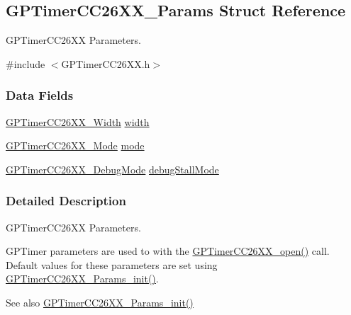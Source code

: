 \subsection{G\+P\+Timer\+C\+C26\+X\+X\+\_\+\+Params Struct Reference}
\label{struct_g_p_timer_c_c26_x_x___params}


G\+P\+Timer\+C\+C26\+X\+X Parameters.  




{\ttfamily \#include $<$G\+P\+Timer\+C\+C26\+X\+X.\+h$>$}

\subsubsection*{Data Fields}
\begin{DoxyCompactItemize}
\item 
\hyperlink{_g_p_timer_c_c26_x_x_8h_a37f7594eb4084eff43d5b80bb6418ec7}{G\+P\+Timer\+C\+C26\+X\+X\+\_\+\+Width} \hyperlink{struct_g_p_timer_c_c26_x_x___params_a4c9e040425769960160b4d42496f5aec}{width}
\item 
\hyperlink{_g_p_timer_c_c26_x_x_8h_ac3f0539fd948c59b31df04dff5b7024c}{G\+P\+Timer\+C\+C26\+X\+X\+\_\+\+Mode} \hyperlink{struct_g_p_timer_c_c26_x_x___params_ae911c92ad3079146c568a02575bb6300}{mode}
\item 
\hyperlink{_g_p_timer_c_c26_x_x_8h_ab4c80c79c9acaf8e482e8244adbae73e}{G\+P\+Timer\+C\+C26\+X\+X\+\_\+\+Debug\+Mode} \hyperlink{struct_g_p_timer_c_c26_x_x___params_aebaace525be6fc274c77ff655f604754}{debug\+Stall\+Mode}
\end{DoxyCompactItemize}


\subsubsection{Detailed Description}
G\+P\+Timer\+C\+C26\+X\+X Parameters. 

G\+P\+Timer parameters are used to with the \hyperlink{_g_p_timer_c_c26_x_x_8h_a30f6c028f0abea0b35c3be3d1609ea9b}{G\+P\+Timer\+C\+C26\+X\+X\+\_\+open()} call. Default values for these parameters are set using \hyperlink{_g_p_timer_c_c26_x_x_8h_a11e9f3ff24f5f075989f89d99e65e827}{G\+P\+Timer\+C\+C26\+X\+X\+\_\+\+Params\+\_\+init()}.

\begin{DoxySeeAlso}{See also}
\hyperlink{_g_p_timer_c_c26_x_x_8h_a11e9f3ff24f5f075989f89d99e65e827}{G\+P\+Timer\+C\+C26\+X\+X\+\_\+\+Params\+\_\+init()} 
\end{DoxySeeAlso}


